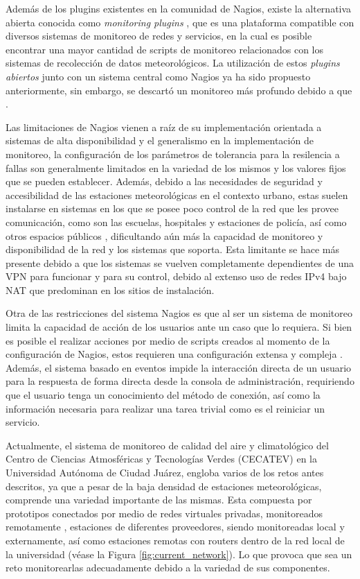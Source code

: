 Además de los plugins existentes en la comunidad de Nagios, existe la alternativa abierta conocida como \textit{monitoring plugins} \cite{monitoring_plugins}, que es una plataforma compatible con diversos sistemas de monitoreo de redes y servicios, en la cual es posible encontrar una mayor cantidad de scripts de monitoreo relacionados con los sistemas de recolección de datos meteorológicos. La utilización de estos \textit{plugins abiertos} junto con un sistema central como Nagios ya ha sido propuesto anteriormente, sin embargo, se descartó un monitoreo más profundo debido a que  \cite{monitoreo_raspberry_nagios}.

Las limitaciones de Nagios vienen a raíz de su implementación orientada a sistemas de alta disponibilidad y el generalismo en la implementación de monitoreo, la configuración de los parámetros de tolerancia para la resilencia a fallas son generalmente limitados en la variedad de los mismos y los valores fijos que se pueden establecer. Además, debido a las necesidades de seguridad y accesibilidad de las estaciones meteorológicas en el contexto urbano, estas suelen instalarse en sistemas en los que se posee poco control de la red que les provee comunicación, como son las escuelas, hospitales y estaciones de policía, así como otros espacios públicos \cite{muller_sensors_and_the_city}, dificultando aún más la capacidad de monitoreo y disponibilidad de la red y los sistemas que soporta. Esta limitante se hace más presente debido a que los sistemas se vuelven completamente dependientes de una VPN para funcionar y para su control, debido al extenso uso de redes IPv4 bajo NAT que predominan en los sitios de instalación.

Otra de las restricciones del sistema Nagios es que al ser un sistema de monitoreo limita la capacidad de acción de los usuarios ante un caso que lo requiera. Si bien es posible el realizar acciones por medio de scripts creados al momento de la configuración de Nagios, estos requieren una configuración extensa y compleja \cite{nagios_service_restart}. Además, el sistema basado en eventos impide la interacción directa de un usuario para la respuesta de forma directa desde la consola de administración, requiriendo que el usuario tenga un conocimiento del método de conexión, así como la información necesaria para realizar una tarea trivial como es el reiniciar un servicio.

Actualmente, el sistema de monitoreo de calidad del aire y climatológico del Centro de Ciencias Atmosféricas y Tecnologías Verdes (CECATEV) en la Universidad Autónoma de Ciudad Juárez, engloba varios de los retos antes descritos, ya que a pesar de la baja densidad de estaciones meteorológicas, comprende una variedad importante de las mismas. Esta compuesta por prototipos conectados por medio de redes virtuales privadas, monitoreados remotamente \cite{red_climatologica_uacj}, estaciones de diferentes proveedores, siendo monitoreadas local y externamente, así como estaciones remotas con routers dentro de la red local de la universidad (véase la Figura \ref{fig:current_network}). Lo que provoca que sea un reto monitorearlas adecuadamente debido a la variedad de sus componentes.

